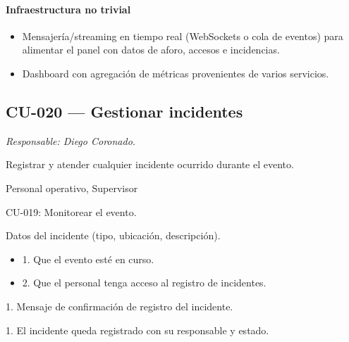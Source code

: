 \paragraph{Infraestructura no trivial}
\begin{itemize}[leftmargin=1.4em, topsep=1pt]
  \item Mensajería/streaming en tiempo real (WebSockets o cola de eventos) para alimentar el panel con datos de aforo, accesos e incidencias.
  \item Dashboard con agregación de métricas provenientes de varios servicios.
\end{itemize}

\subsection{CU-020 --- Gestionar incidentes}
\label{cu:cu-020}
\textit{Responsable: Diego Coronado.}

\begin{description}[leftmargin=!, labelwidth=3.4cm, style=nextline, topsep=3pt]
\item[Objetivo] Registrar y atender cualquier incidente ocurrido durante el evento.

\item[Actores] Personal operativo, Supervisor

\item[CU relacionados] CU-019: Monitorear el evento.

\item[Entradas] Datos del incidente (tipo, ubicación, descripción).

\item[Pre-condiciones] \hfill
\begin{itemize}[leftmargin=1.2em, topsep=1pt]
  \item 1. Que el evento esté en curso.
  \item 2. Que el personal tenga acceso al registro de incidentes.
\end{itemize}

\item[Salidas] 1. Mensaje de confirmación de registro del incidente.

\item[Post-condiciones] 1. El incidente queda registrado con su responsable y estado.

\end{description}

